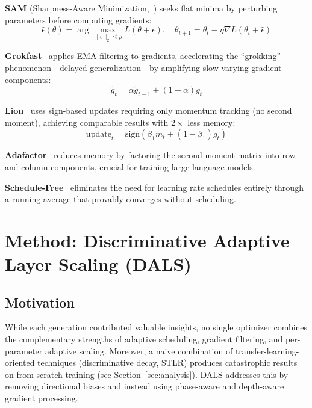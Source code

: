 \documentclass[a4paper,fleqn]{cas-dc}
\begin{document}
\textbf{SAM} (Sharpness-Aware Minimization,~\citet{foret2020sam}) seeks flat minima by perturbing parameters before computing gradients:
\begin{equation}\label{eq:sam}
\hat{\epsilon}(\theta) = \arg\max_{\|\epsilon\|_2 \leq \rho} L(\theta + \epsilon), \quad \theta_{t+1} = \theta_t - \eta \nabla L(\theta_t + \hat{\epsilon})
\end{equation}

\textbf{Grokfast}~\citet{chen2024grokfast} applies EMA filtering to gradients, accelerating the ``grokking'' phenomenon---delayed generalization---by amplifying slow-varying gradient components:
\begin{equation}\label{eq:grokfast}
\tilde{g}_t = \alpha \tilde{g}_{t-1} + (1-\alpha) g_t
\end{equation}

\textbf{Lion}~\citet{chen2023symbolic} uses sign-based updates requiring only momentum tracking (no second moment), achieving comparable results with $2\times$ less memory:
\begin{equation}\label{eq:lion}
\text{update}_t = \text{sign}(\beta_1 m_t + (1-\beta_1) g_t)
\end{equation}

\textbf{Adafactor}~\citet{shazeer2018adafactor} reduces memory by factoring the second-moment matrix into row and column components, crucial for training large language models.

\textbf{Schedule-Free}~\citet{defazio2024schedulefree} eliminates the need for learning rate schedules entirely through a running average that provably converges without scheduling.

\section{Method: Discriminative Adaptive Layer Scaling (DALS)}\label{sec:method}

\subsection{Motivation}

While each generation contributed valuable insights, no single optimizer combines the complementary strengths of adaptive scheduling, gradient filtering, and per-parameter adaptive scaling. Moreover, a naive combination of transfer-learning-oriented techniques (discriminative decay, STLR) produces catastrophic results on from-scratch training (see Section~\ref{sec:analysis}). DALS addresses this by removing directional biases and instead using phase-aware and depth-aware gradient processing.
\end{document}
